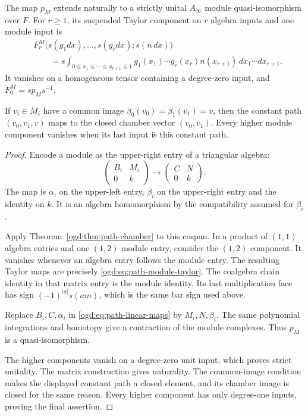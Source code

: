 \begin{proposition}\label{ogd:prop:path-modules}
The map \(p_M\) extends naturally to a strictly unital \(A_\infty\)
module quasi-isomorphism over \(F\).
For \(r\geq1\), its suspended Taylor component on \(r\) algebra inputs
and one module input is
\begin{equation}\label{ogd:eq:path-module-taylor}
\begin{split}
 &F^M_r\bigl(s(g_1dx),\ldots,s(g_rdx);s(n\,dx)\bigr)\\
 &\qquad=
 s\int_{0\leq x_1\leq\cdots\leq x_{r+1}\leq1}
 g_1(x_1)\cdots g_r(x_r)n(x_{r+1})\,dx_1\cdots dx_{r+1}.
\end{split}
\end{equation}
It vanishes on a homogeneous tensor containing a degree-zero input,
and \(F^M_0=s p_M s^{-1}\).

If \(v_i\in M_i\) have a common image
\(\beta_0(v_0)=\beta_1(v_1)=v\), then the constant path
\((v_0,v_1,v)\) maps to the closed chamber vector \((v_0,v_1)\).
Every higher module component vanishes when its last input is this
constant path.
\end{proposition}

\begin{proof}
Encode a module as the upper-right entry of a triangular algebra:
\[
 \begin{pmatrix}B_i&M_i\\0&k\end{pmatrix}
 \longrightarrow
 \begin{pmatrix}C&N\\0&k\end{pmatrix}.
\]
The map is \(\alpha_i\) on the upper-left entry, \(\beta_i\) on the
upper-right entry and the identity on \(k\).
It is an algebra homomorphism by the compatibility assumed for
\(\beta_i\).

Apply Theorem~\ref{ogd:thm:path-chamber} to this cospan.
In a product of \((1,1)\) algebra entries and one \((1,2)\) module entry,
consider the \((1,2)\) component.
It vanishes whenever an algebra entry follows the module entry.
The resulting Taylor maps are precisely
\eqref{ogd:eq:path-module-taylor}.
The coalgebra chain identity in that matrix entry is the module identity.
Its last multiplication face has sign
\((-1)^{|a|}s(am)\), which is the same bar sign used above.

Replace \(B_i,C,\alpha_i\) in \eqref{ogd:eq:path-linear-maps} by
\(M_i,N,\beta_i\).
The same polynomial integrations and homotopy give a contraction of the
module complexes.
Thus \(p_M\) is a quasi-isomorphism.

The higher components vanish on a degree-zero unit input, which proves
strict unitality.
The matrix construction gives naturality.
The common-image condition makes the displayed constant path a closed
element, and its chamber image is closed for the same reason.
Every higher component has only degree-one inputs, proving the final
assertion.
\end{proof}


